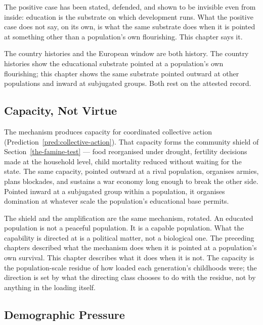 \documentclass[12pt,letterpaper]{article}
\begin{document}
The positive case has been stated, defended, and shown to be invisible
even from inside: education is the substrate on which
development runs. What the positive case does not say, on its own, is
what the same substrate does when it is pointed at something other than
a population's own flourishing. This chapter says it.

The country histories and the European window are both history. The
country histories show the educational substrate pointed at a
population's own flourishing; this chapter shows the same substrate
pointed outward at other populations and inward at subjugated groups.
Both rest on the attested record.

\subsection{Capacity, Not Virtue}\label{capacity-not-virtue}

The mechanism produces capacity for coordinated collective action
(Prediction~\ref{pred:collective-action}). That capacity forms the
community shield of Section~\ref{the-famine-test} --- food reorganised
under drought, fertility decisions made at the household level, child
mortality reduced without waiting for the state. The same capacity,
pointed outward at a rival population, organises armies, plans
blockades, and sustains a war economy long enough to break the other
side. Pointed inward at a subjugated group within a population, it
organises domination at whatever scale the population's educational
base permits.

The shield and the amplification are the same mechanism, rotated. An
educated population is not a peaceful population. It is a capable
population. What the capability is directed at is a political matter,
not a biological one. The preceding chapters described what the
mechanism does when it is pointed at a population's own survival. This
chapter describes what it does when it is not. The capacity is the
population-scale residue of how loaded each generation's childhoods
were; the direction is set by what the directing class chooses to do
with the residue, not by anything in the loading itself.

\subsection{Demographic Pressure}\label{demographic-pressure}
\end{document}
